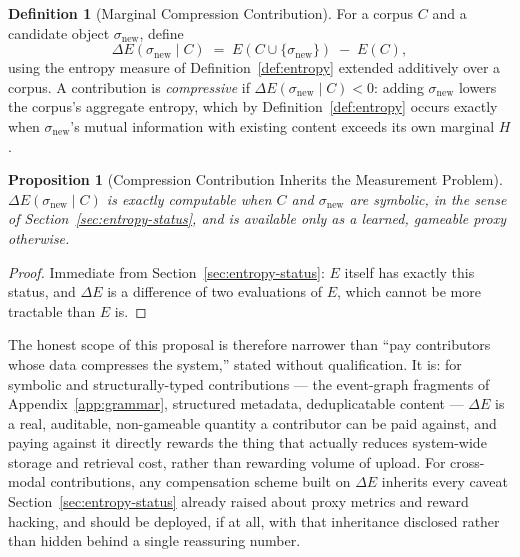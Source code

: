 \documentclass[11pt]{article}
\newtheorem{proposition}[theorem]{Proposition}
\theoremstyle{definition}
\newtheorem{definition}[theorem]{Definition}
\begin{document}
\begin{definition}[Marginal Compression Contribution]
\label{def:compression-contribution}
For a corpus $C$ and a candidate object $\sigma_{\mathrm{new}}$, define
\[
\Delta E(\sigma_{\mathrm{new}} \mid C) \;=\; E(C \cup \{\sigma_{\mathrm{new}}\}) \;-\; E(C),
\]
using the entropy measure of Definition~\ref{def:entropy} extended additively over a corpus. A contribution is \emph{compressive} if $\Delta E(\sigma_{\mathrm{new}} \mid C) < 0$: adding $\sigma_{\mathrm{new}}$ lowers the corpus's aggregate entropy, which by Definition~\ref{def:entropy} occurs exactly when $\sigma_{\mathrm{new}}$'s mutual information with existing content exceeds its own marginal $H$.
\end{definition}

\begin{proposition}[Compression Contribution Inherits the Measurement Problem]
\label{prop:compression-inherits}
$\Delta E(\sigma_{\mathrm{new}} \mid C)$ is exactly computable when $C$ and $\sigma_{\mathrm{new}}$ are symbolic, in the sense of Section~\ref{sec:entropy-status}, and is available only as a learned, gameable proxy otherwise.
\end{proposition}
\begin{proof}
Immediate from Section~\ref{sec:entropy-status}: $E$ itself has exactly this status, and $\Delta E$ is a difference of two evaluations of $E$, which cannot be more tractable than $E$ is.
\end{proof}

The honest scope of this proposal is therefore narrower than ``pay contributors whose data compresses the system,'' stated without qualification. It is: for symbolic and structurally-typed contributions --- the event-graph fragments of Appendix~\ref{app:grammar}, structured metadata, deduplicatable content --- $\Delta E$ is a real, auditable, non-gameable quantity a contributor can be paid against, and paying against it directly rewards the thing that actually reduces system-wide storage and retrieval cost, rather than rewarding volume of upload. For cross-modal contributions, any compensation scheme built on $\Delta E$ inherits every caveat Section~\ref{sec:entropy-status} already raised about proxy metrics and reward hacking, and should be deployed, if at all, with that inheritance disclosed rather than hidden behind a single reassuring number.
\end{document}
